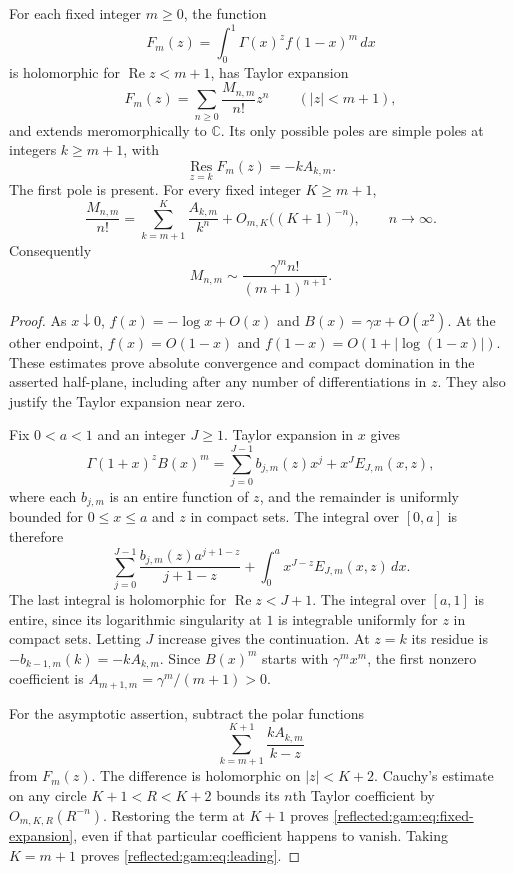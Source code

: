 \begin{theorem}\label{reflected:gam:thm:expansion}
For each fixed integer $m\ge0$, the function
\[
 F_m(z)=\int_0^1\Gamma(x)^z f(1-x)^m\,dx
\]
is holomorphic for $\operatorname{Re}z<m+1$, has Taylor expansion
\[
 F_m(z)=\sum_{n\ge0}\frac{M_{n,m}}{n!}z^n
 \qquad (|z|<m+1),
\]
and extends meromorphically to $\mathbb C$.  Its only possible poles
are simple poles at integers $k\ge m+1$, with
\begin{equation}\label{reflected:gam:eq:poles}
 \operatorname*{Res}_{z=k}F_m(z)=-kA_{k,m}.
\end{equation}
The first pole is present.  For every fixed integer $K\ge m+1$,
\begin{equation}\label{reflected:gam:eq:fixed-expansion}
 \frac{M_{n,m}}{n!}
 =\sum_{k=m+1}^{K}\frac{A_{k,m}}{k^n}
   +O_{m,K}\bigl((K+1)^{-n}\bigr),\qquad n\longrightarrow\infty.
\end{equation}
Consequently
\begin{equation}\label{reflected:gam:eq:leading}
 M_{n,m}\sim \frac{\gamma^m n!}{(m+1)^{n+1}}.
\end{equation}
\end{theorem}

\begin{proof}
As $x\downarrow0$, $f(x)=-\log x+O(x)$ and
$B(x)=\gamma x+O(x^2)$.  At the other endpoint,
$f(x)=O(1-x)$ and $f(1-x)=O(1+|\log(1-x)|)$.
These estimates prove absolute convergence and compact domination in
the asserted half-plane, including after any number of differentiations
in $z$.  They also justify the Taylor expansion near zero.

Fix $0<a<1$ and an integer $J\ge1$.  Taylor expansion in $x$ gives
\[
 \Gamma(1+x)^z B(x)^m
 =\sum_{j=0}^{J-1}b_{j,m}(z)x^j+x^J E_{J,m}(x,z),
\]
where each $b_{j,m}$ is an entire function of $z$, and the remainder is
uniformly bounded for $0\le x\le a$ and $z$ in compact sets.
The integral over $[0,a]$ is therefore
\[
 \sum_{j=0}^{J-1}\frac{b_{j,m}(z)a^{j+1-z}}{j+1-z}
 +\int_0^a x^{J-z}E_{J,m}(x,z)\,dx.
\]
The last integral is holomorphic for $\operatorname{Re}z<J+1$.
The integral over $[a,1]$ is entire, since its logarithmic singularity
at $1$ is integrable uniformly for $z$ in compact sets.  Letting $J$
increase gives the continuation.  At $z=k$ its residue is
$-b_{k-1,m}(k)=-kA_{k,m}$.  Since $B(x)^m$ starts with
$\gamma^m x^m$, the first nonzero coefficient is
$A_{m+1,m}=\gamma^m/(m+1)>0$.

For the asymptotic assertion, subtract the polar functions
\[
 \sum_{k=m+1}^{K+1}\frac{kA_{k,m}}{k-z}
\]
from $F_m(z)$.  The difference is holomorphic on $|z|<K+2$.
Cauchy's estimate on any circle $K+1<R<K+2$ bounds its $n$th Taylor
coefficient by $O_{m,K,R}(R^{-n})$.  Restoring the term at $K+1$
proves \eqref{reflected:gam:eq:fixed-expansion}, even if that particular coefficient
happens to vanish.  Taking $K=m+1$ proves \eqref{reflected:gam:eq:leading}.
\end{proof}

